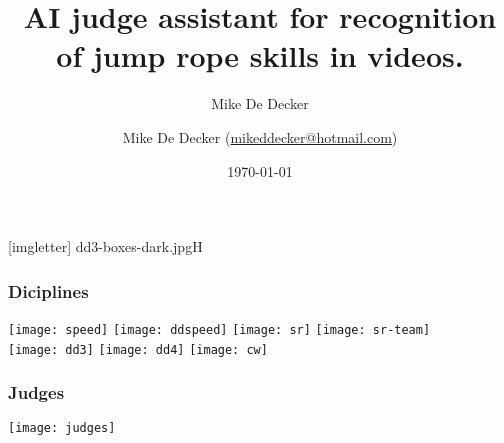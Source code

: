 \documentclass[aspectratio=169]{beamer}
\title[AI Judge]{AI judge assistant for recognition of jump rope skills in videos.}
\author{Mike De Decker}
\author[MDD]{Mike {De Decker} (\href{mailto:mikeddecker@hotmail.com}
    {mikeddecker@hotmail.com})}
\date{\today}
\begin{document}

{
[imgletter]
    {dd3-boxes-dark.jpg}{H}

\begin{frame}
    \maketitle
\end{frame}
}


\begin{frame}
  \frametitle{Diciplines}

  \hspace{0.1cm}\texttt{[image: speed]}
  \hspace{0.1cm}\texttt{[image: ddspeed]}
  \hspace{0.1cm}\texttt{[image: sr]}
  \hspace{0.1cm}\texttt{[image: sr-team]} \\
  \vspace{0.1cm}
  \hspace{0.1cm}\texttt{[image: dd3]}
  \hspace{0.1cm}\texttt{[image: dd4]}
  \hspace{0.1cm}\texttt{[image: cw]}

\end{frame}




\begin{frame}
  \frametitle{Judges}
  \vspace{-1.5cm}
  \texttt{[image: judges]}
  
\end{frame}
\end{document}
